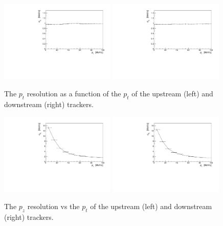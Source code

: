   \begin{figure}[p]
   \begin{center}
     \includegraphics[width=0.49\textwidth, angle=0]{08-Performance/upstream_pt_resolution_pt.pdf}
     \includegraphics[width=0.49\textwidth, angle=0]{08-Performance/downstream_pt_resolution_pt.pdf}
     \caption{\label{fig:PtPtResolKalman} The $p_{t}$ resolution as a function of the $p_{t}$ of the upstream (left) and downstream (right) trackers.}
   \end{center}
  \end{figure}
  
  \begin{figure}[p]
   \begin{center}
     \includegraphics[width=0.49\textwidth, angle=0]{08-Performance/upstream_pz_resolution_pt.pdf}
     \includegraphics[width=0.49\textwidth, angle=0]{08-Performance/downstream_pz_resolution_pt.pdf}
     \caption{\label{fig:PtPzResolKalman} The $p_z$ resolution vs the $p_{t}$ of the upstream (left) and downstream (right) trackers.}
   \end{center}
  \end{figure}

